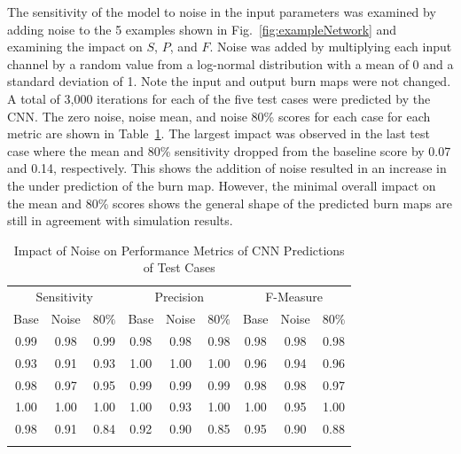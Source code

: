 \documentclass[smallcondensed]{svjour3}     %
\begin{document}
The sensitivity of the model to noise in the input parameters was examined
by adding noise to the 5 examples shown in Fig.~\ref{fig:exampleNetwork}
and examining the impact on $S$, $P$, and $F$. Noise was added by multiplying
each input channel by a random value from a log-normal distribution with a
mean of 0 and a standard deviation of 1. Note the input and output burn maps
were not changed. A total of 3,000 iterations for each of the five test
cases were predicted by the CNN. The zero noise, noise mean, and noise 80\%
scores for each case for each metric are shown in Table~\ref{tab:noise}.
The largest impact was observed in the last test case where the mean and 80\%
sensitivity dropped from the baseline score by 0.07 and 0.14,
respectively. This shows the addition of noise resulted in an increase in
the under prediction of the burn map.
However, the minimal overall impact on the mean and 80\% scores
shows the general shape of the predicted burn maps are still in agreement
with simulation results.

\begin{table}[htb]
\centering
\caption{Impact of Noise on Performance Metrics of CNN Predictions of Test Cases}
\label{tab:noise}       %
\begin{tabular*}{0.95\textwidth}{c @{\extracolsep{\fill}} cccccccc}
\multicolumn{3}{c}{Sensitivity} & \multicolumn{3}{c}{Precision} & \multicolumn{3}{c}{F-Measure} \\

Base & Noise & $80\%$ & Base & Noise & $80\%$ & Base & Noise & $80\%$ \\
\noalign{\smallskip}\hline\noalign{\smallskip}
0.99 & 0.98 & 0.99 & 0.98 & 0.98 & 0.98 & 0.98 & 0.98 & 0.98 \\
0.93 & 0.91 & 0.93 & 1.00 & 1.00 & 1.00 & 0.96 & 0.94 & 0.96 \\
0.98 & 0.97 & 0.95 & 0.99 & 0.99 & 0.99 & 0.98 & 0.98 & 0.97 \\
1.00 & 1.00 & 1.00 & 1.00 & 0.93 & 1.00 & 1.00 & 0.95 & 1.00 \\
0.98 & 0.91 & 0.84 & 0.92 & 0.90 & 0.85 & 0.95 & 0.90 & 0.88 \\
\noalign{\smallskip}\hline
\end{tabular*}
\end{table}
\end{document}
